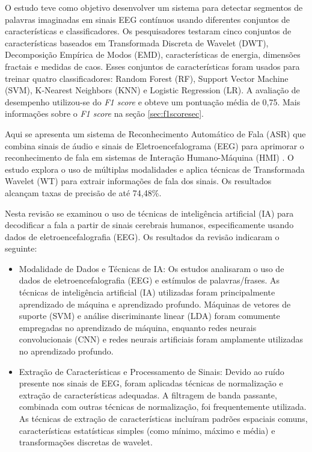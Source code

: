 \documentclass[a4paper,12pt,openright,oneside]{book}
\newenvironment{myenv}[1]
  {\begin{spacing}{#1}}
  {\end{spacing}}
\begin{document}
\begin{myenv}{1.5}
			\par O estudo \cite{WOS:000614122200021} teve como objetivo desenvolver um sistema para detectar segmentos de palavras imaginadas em sinais EEG contínuos usando diferentes conjuntos de características e classificadores. Os pesquisadores testaram cinco conjuntos de características baseados em Transformada Discreta de Wavelet (DWT), Decomposição Empírica de Modos (EMD), características de energia, dimensões fractais e medidas de caos. Esses conjuntos de características foram usados para treinar quatro classificadores: Random Forest (RF), Support Vector Machine (SVM), K-Nearest Neighbors (KNN) e Logistic Regression (LR). A avaliação de desempenho utilizou-se do \textit{F1 score} \cite{tharwat2020classification} e obteve um pontuação média de 0,75. Mais informações sobre o \textit{F1 score} na seção \ref{sec:f1scoresec}.\newline
			
			\par Aqui se apresenta um sistema de Reconhecimento Automático de Fala (ASR) que combina sinais de áudio e sinais de Eletroencefalograma (EEG) para aprimorar o reconhecimento de fala em sistemas de Interação Humano-Máquina (HMI) \cite{WOS:000591530700001}. O estudo explora o uso de múltiplas modalidades e aplica técnicas de Transformada Wavelet (WT) para extrair informações de fala dos sinais.
			Os resultados alcançam taxas de precisão de até 74,48\%.\newline

			\par Nesta revisão \cite{WOS:000857544900001} se examinou o uso de técnicas de inteligência artificial (IA) para decodificar a fala a partir de sinais cerebrais humanos, especificamente usando dados de eletroencefalografia (EEG). Os resultados da revisão indicaram o seguinte:
			
			\begin{itemize}
				\item Modalidade de Dados e Técnicas de IA: Os estudos analisaram o uso de dados de eletroencefalografia (EEG) e estímulos de palavras/frases. As técnicas de inteligência artificial (IA) utilizadas foram principalmente aprendizado de máquina e aprendizado profundo. Máquinas de vetores de suporte (SVM) e análise discriminante linear (LDA) foram comumente empregadas no aprendizado de máquina, enquanto redes neurais convolucionais (CNN) e redes neurais artificiais foram amplamente utilizadas no aprendizado profundo.
				
				\item Extração de Características e Processamento de Sinais: Devido ao ruído presente nos sinais de EEG, foram aplicadas técnicas de normalização e extração de características adequadas. A filtragem de banda passante, combinada com outras técnicas de normalização, foi frequentemente utilizada. As técnicas de extração de características incluíram padrões espaciais comuns, características estatísticas simples (como mínimo, máximo e média) e transformações discretas de wavelet.
				

\end{itemize}
\end{myenv}
\end{document}
